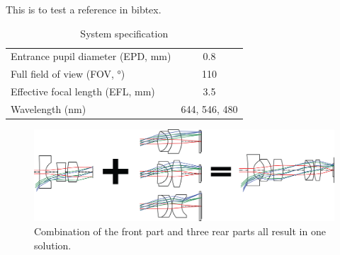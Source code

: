 \documentclass{article}
\begin{document}
This is to test a reference in bibtex. \cite{book:Shannon1997}







\setlength{\arrayrulewidth}{.5mm}
\setlength{\tabcolsep}{18pt}
\renewcommand{\arraystretch}{1.2}
\begin{table}[h!]
    \centering
    \captionsetup{justification=centering}
    \caption{System specification}
    \label{table: sysspec}
    \vspace{-1em}
    \begin{tabular}{ p{20em} c }
    \hline 
    Entrance pupil diameter (EPD, mm) & 0.8\\
    Full field of view (FOV, °) & 110\\
    Effective focal length (EFL, mm) & 3.5\\
    Wavelength (nm) & 644, 546, 480\\
    \hline
    \end{tabular}
\end{table}

\begin{figure}[h!]
    \centering
    \includegraphics[width=\textwidth]{chapter-4/figures/WAL_combine.png}
    \caption{Combination of the front part and three rear parts all result in one solution.}
    \label{fig:WAL_combine}
\end{figure}
\end{document}
